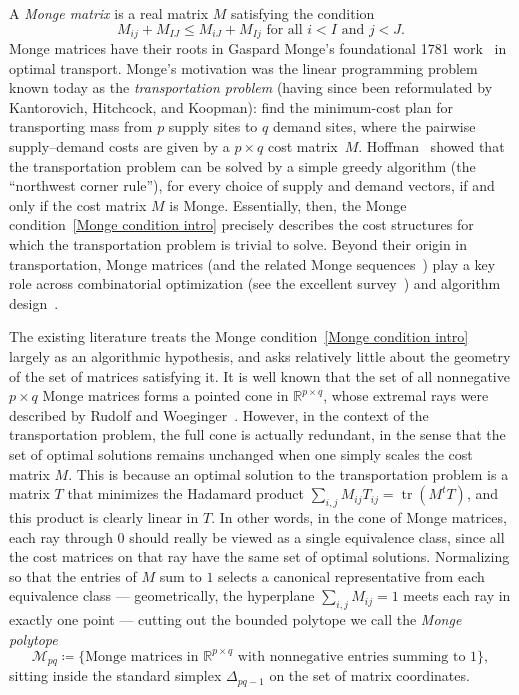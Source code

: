 \documentclass[noamsfonts,10pt]{amsart}
\newcommand{\R}{\mathbb{R}}
\newcommand{\M}{\mathcal{M}}
\newcommand{\1}{\mathbf{1}}
\theoremstyle{plain}
\theoremstyle{definition}
\numberwithin{equation}{section}
\begin{document}
A \emph{Monge matrix} is a real matrix $M$ satisfying the condition 
\begin{equation}
    \label{Monge condition intro}
    M_{ij} + M_{IJ} \leq M_{iJ} + M_{Ij} \text{ for all $i < I$ and $j < J$}.
\end{equation}
Monge matrices have their roots in Gaspard Monge's foundational 1781 work~\cite{Monge} in optimal transport.
Monge's motivation was the linear programming problem known today as the \emph{transportation problem} (having since been reformulated by Kantorovich, Hitchcock, and Koopman):
find the minimum-cost plan for transporting mass from $p$ supply sites to $q$ demand sites, where the pairwise supply--demand costs are given by a $p \times q$ cost matrix~$M$.
Hoffman~\cite{Hoffman} showed that the transportation problem can be solved by a simple greedy algorithm (the ``northwest corner rule''), for every choice of supply and demand vectors, if and only if the cost matrix $M$ is Monge.
Essentially, then, the Monge condition~\eqref{Monge condition intro} precisely describes the cost structures for which the transportation problem is trivial to solve.
Beyond their origin in transportation, Monge matrices (and the related Monge sequences~\cite{BN22}) play a key role across combinatorial optimization (see the excellent survey~\cite{Burkard}) and algorithm design~\cites{Aggarwal87,FR06,GP,KMW10}.

The existing literature treats the Monge condition~\eqref{Monge condition intro} largely as an algorithmic hypothesis, and asks relatively little about the geometry of the set of matrices satisfying it.
It is well known that the set of all nonnegative $p \times q$ Monge matrices forms a pointed cone in $\R^{p \times q}$, whose extremal rays were described by Rudolf and Woeginger~\cite{RW95}.
However, in the context of the transportation problem, the full cone is actually redundant, in the sense that the set of optimal solutions remains unchanged when one simply scales the cost matrix $M$.
This is because an optimal solution to the transportation problem is a matrix $T$ that minimizes the Hadamard product $\sum_{i,j} M_{ij} T_{ij} = \operatorname{tr}(M^t T)$, and this product is clearly linear in $T$.
In other words, in the cone of Monge matrices, each ray through $0$ should really be viewed as a single equivalence class, since all the cost matrices on that ray have the same set of optimal solutions.
Normalizing so that the entries of $M$ sum to $1$ selects a canonical representative from each equivalence class ---
geometrically, the hyperplane $\sum_{i,j} M_{ij} = 1$ meets each ray in exactly one point --- cutting out the bounded polytope we call the \emph{Monge polytope}
\[
    \M_{pq} \coloneqq \Big\{ \text{Monge matrices in $\R^{p \times q}$ with nonnegative entries summing to $1$} \Big\},
\]
sitting inside the standard simplex $\Delta_{pq-1}$ on the set of matrix coordinates.
\end{document}
